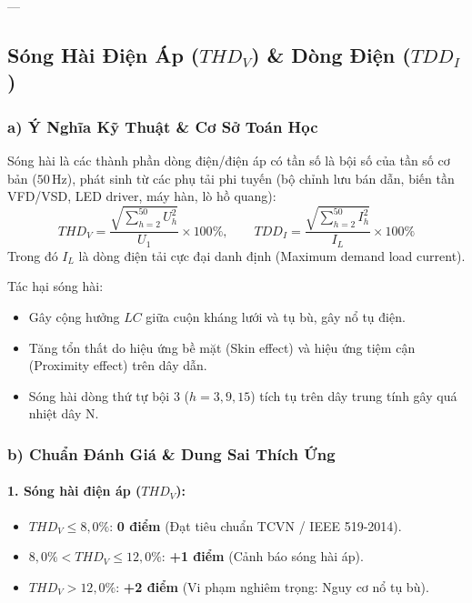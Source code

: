 \documentclass[12pt,a4paper]{article}
\begin{document}
---

\subsection{\texorpdfstring{Sóng Hài Điện Áp ($THD_V$) \& Dòng Điện ($TDD_I$)}{Sóng Hài Điện Áp (THD V) & Dòng Điện (TDD I)}}

\subsubsection{a) Ý Nghĩa Kỹ Thuật \& Cơ Sở Toán Học}
Sóng hài là các thành phần dòng điện/điện áp có tần số là bội số của tần số cơ bản ($50\,\mathrm{Hz}$), phát sinh từ các phụ tải phi tuyến (bộ chỉnh lưu bán dẫn, biến tần VFD/VSD, LED driver, máy hàn, lò hồ quang):
\begin{equation}
  THD_V = \frac{\sqrt{\sum_{h=2}^{50} U_h^2}}{U_1} \times 100\%, \qquad
  TDD_I = \frac{\sqrt{\sum_{h=2}^{50} I_h^2}}{I_L} \times 100\%
\end{equation}
Trong đó $I_L$ là dòng điện tải cực đại danh định (Maximum demand load current). 

Tác hại sóng hài:
\begin{itemize}
  \item Gây cộng hưởng $LC$ giữa cuộn kháng lưới và tụ bù, gây nổ tụ điện.
  \item Tăng tổn thất do hiệu ứng bề mặt (Skin effect) và hiệu ứng tiệm cận (Proximity effect) trên dây dẫn.
  \item Sóng hài dòng thứ tự bội 3 ($h=3, 9, 15$) tích tụ trên dây trung tính gây quá nhiệt dây N.
\end{itemize}

\subsubsection{b) Chuẩn Đánh Giá \& Dung Sai Thích Ứng}

\paragraph{1. Sóng hài điện áp ($THD_V$):}
\begin{itemize}
  \item $THD_V \le 8{,}0\%$: \textbf{0 điểm} (Đạt tiêu chuẩn TCVN / IEEE 519-2014).
  \item $8{,}0\% < THD_V \le 12{,}0\%$: \textbf{+1 điểm} (Cảnh báo sóng hài áp).
  \item $THD_V > 12{,}0\%$: \textbf{+2 điểm} (Vi phạm nghiêm trọng: Nguy cơ nổ tụ bù).
\end{itemize}
\end{document}
